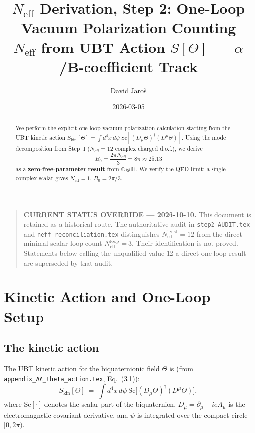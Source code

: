 \documentclass[12pt,a4paper]{article}
\title{%
  $N_\mathrm{eff}$ Derivation, Step 2: One-Loop Vacuum Polarization Counting\\
  \large $N_{\mathrm{eff}}$ from UBT Action $S[\Theta]$ --- $\alpha$/B-coefficient Track}
\author{David Jaroš}
\date{2026-03-05}
\theoremstyle{definition}
\theoremstyle{remark}
\newcommand{\C}{\mathbb{C}}
\renewcommand{\H}{\mathbb{H}}
\newcommand{\Neff}{N_{\mathrm{eff}}}
\newcommand{\Sc}{\mathrm{Sc}}
\begin{document}
\maketitle

\begin{quote}
\textbf{CURRENT STATUS OVERRIDE — 2026-10-10.}
This document is retained as a historical route.  The authoritative audit in
\texttt{step2\_AUDIT.tex} and \texttt{neff\_reconciliation.tex} distinguishes
\(N_{\mathrm{eff}}^{\mathrm{twist}}=12\) from the direct minimal scalar-loop
count \(N_{\mathrm{eff}}^{\mathrm{loop}}=3\).  Their identification is not
proved.  Statements below calling the unqualified value 12 a direct one-loop
result are superseded by that audit.
\end{quote}


\begin{abstract}
We perform the explicit one-loop vacuum polarization calculation starting from
the UBT kinetic action
$S_\mathrm{kin}[\Theta] = \int d^4x\,d\psi\;\Sc[(D_\mu\Theta)^\dagger(D^\mu\Theta)]$.
Using the mode decomposition from Step~1 ($\Neff = 12$ complex charged d.o.f.),
we derive
\begin{equation*}
  B_0 = \frac{2\pi \Neff}{3} = 8\pi \approx 25.13
\end{equation*}
as a \textbf{zero-free-parameter result} from $\C \otimes \H$.
We verify the QED limit: a single complex scalar gives $\Neff = 1$, $B_0 = 2\pi/3$.
\end{abstract}

\tableofcontents

\section{Kinetic Action and One-Loop Setup}
\label{sec:setup}

\subsection{The kinetic action}

The UBT kinetic action for the biquaternionic field $\Theta$ is
(from \texttt{appendix\_AA\_theta\_action.tex}, Eq.~(3.1)):
\begin{equation}
  S_\mathrm{kin}[\Theta]
  \;=\; \int d^4x\,d\psi\;
  \Sc\!\bigl[(D_\mu\Theta)^\dagger(D^\mu\Theta)\bigr],
  \label{eq:S_kin}
\end{equation}
where $\Sc[\cdot]$ denotes the scalar part of the biquaternion,
$D_\mu = \partial_\mu + ieA_\mu$ is the electromagnetic covariant derivative,
and $\psi$ is integrated over the compact circle $[0,2\pi)$.
\end{document}
